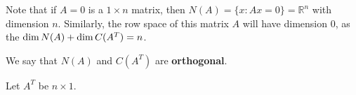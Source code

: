 
Note that if \( A=0 \) is a \( 1\times n \) matrix, then \( N(A) = \{x : Ax=0\} = \mathbb{R}^{n}  \) with dimension \( n \). Similarly, the row space of this matrix \( A \) will have dimension 0, as the \( \operatorname{dim} N(A) + \operatorname{dim} C(A^{T} ) =n\).

\begin{definition}
	We say that \( N(A) \) and \( C(A^{T} ) \) are \textbf{orthogonal}.
\end{definition}

Let \( A^{T} \) be \( n\times 1 \).  
